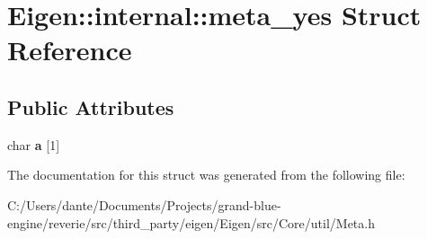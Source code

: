 \hypertarget{struct_eigen_1_1internal_1_1meta__yes}{}\section{Eigen\+::internal\+::meta\+\_\+yes Struct Reference}
\label{struct_eigen_1_1internal_1_1meta__yes}
\subsection*{Public Attributes}
\begin{DoxyCompactItemize}
\item 
\mbox{\label{struct_eigen_1_1internal_1_1meta__yes_a4a06d3ea1997ce329ac28ca16b2696f2}} 
char {\bfseries a} \mbox{[}1\mbox{]}
\end{DoxyCompactItemize}


The documentation for this struct was generated from the following file\+:\begin{DoxyCompactItemize}
\item 
C\+:/\+Users/dante/\+Documents/\+Projects/grand-\/blue-\/engine/reverie/src/third\+\_\+party/eigen/\+Eigen/src/\+Core/util/Meta.\+h\end{DoxyCompactItemize}
